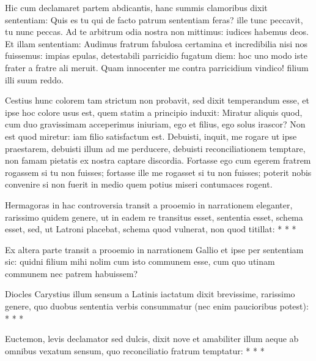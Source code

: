Hic cum declamaret partem abdicantis, hanc summis clamoribus dixit sententiam: Quis es tu qui de facto patrum sententiam feras? ille tunc peccavit, tu nunc peccas. Ad te arbitrum odia nostra non mittimus: iudices habemus deos. Et illam sententiam: Audimus fratrum fabulosa certamina et incredibilia nisi nos fuissemus: impias epulas, detestabili parricidio fugatum diem: hoc uno modo iste frater a fratre ali meruit. Quam innocenter me contra parricidium vindico! filium illi suum reddo.

Cestius hunc colorem tam strictum non probavit, sed dixit temperandum esse, et ipse hoc colore usus est, quem statim a principio induxit: Miratur aliquis quod, cum duo gravissimam acceperimus iniuriam, ego et filius, ego solus irascor? Non est quod miretur: iam filio satisfactum est. Debuisti, inquit, me rogare ut ipse praestarem, debuisti illum ad me perducere, debuisti reconciliationem temptare, non famam pietatis ex nostra captare discordia. Fortasse ego cum egerem fratrem rogassem si tu non fuisses; fortasse ille me rogasset si tu non fuisses; poterit nobis convenire si non fuerit in medio quem potius miseri contumaces rogent.

\bigskip

Hermagoras in hac controversia transit a prooemio in narrationem eleganter, rarissimo quidem genere, ut in eadem re transitus esset, sententia esset, schema esset, sed, ut Latroni placebat, schema quod vulnerat, non quod titillat: * * * 

Ex altera parte transit a prooemio in narrationem Gallio et ipse per sententiam sic: quidni filium mihi nolim cum isto communem esse, cum quo utinam communem nec patrem habuissem? 

Diocles Carystius illum sensum a Latinis iactatum dixit brevissime, rarissimo genere, quo duobus sententia verbis consummatur (nec enim paucioribus potest): * * * 

Euctemon, levis declamator sed dulcis, dixit nove et amabiliter illum aeque ab omnibus vexatum sensum, quo reconciliatio fratrum temptatur: * * * 

